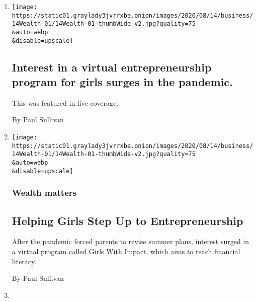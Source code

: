 \begin{enumerate}
\def\labelenumi{\arabic{enumi}.}
\item
  \href{/live/2020/08/14/business/stock-market-today-coronavirus/interest-in-a-virtual-entrepreneurship-program-for-girls-surges-in-the-pandemic}{}

  \texttt{[image: https://static01.graylady3jvrrxbe.onion/images/2020/08/14/business/14Wealth-01/14Wealth-01-thumbWide-v2.jpg?quality=75\\\&auto=webp\\\&disable=upscale]}

  \hypertarget{interest-in-a-virtual-entrepreneurship-program-for-girls-surges-in-the-pandemic}{%
  \subsection{Interest in a virtual entrepreneurship program for girls
  surges in the
  pandemic.}\label{interest-in-a-virtual-entrepreneurship-program-for-girls-surges-in-the-pandemic}}

  This was featured in live coverage.

  By Paul Sullivan
\item
  \href{/2020/08/14/your-money/girls-entrepreneurship-financial-literacy.html}{}

  \texttt{[image: https://static01.graylady3jvrrxbe.onion/images/2020/08/14/business/14Wealth-01/14Wealth-01-thumbWide-v2.jpg?quality=75\\\&auto=webp\\\&disable=upscale]}

  \hypertarget{wealth-matters}{%
  \subsubsection{Wealth matters}\label{wealth-matters}}

  \hypertarget{helping-girls-step-up-to-entrepreneurship}{%
  \subsection{Helping Girls Step Up to
  Entrepreneurship}\label{helping-girls-step-up-to-entrepreneurship}}

  After the pandemic forced parents to revise summer plans, interest
  surged in a virtual program called Girls With Impact, which aims to
  teach financial literacy.

  By Paul Sullivan
\item
  \href{/live/2020/08/07/business/stock-market-today-coronavirus/wealthy-families-are-throwing-a-lifeline-to-distressed-businesses}{}


\end{enumerate}
